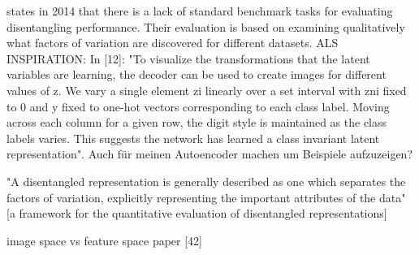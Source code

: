 \documentclass[12pt,a4paper]{article}
\begin{document}
\par\cite{1412.6583} states in 2014 that there is a lack of standard benchmark tasks for evaluating disentangling performance. Their evaluation is based on examining qualitatively what factors of variation are discovered for different datasets. ALS INSPIRATION: In [12]: "To visualize the transformations that the latent variables are learning, the decoder can be used to create images for different values of z. We vary a single element zi linearly over a set interval with zni fixed to 0 and y fixed to one-hot vectors corresponding to each class label. Moving across each column for a given row, the digit style is maintained as the class labels varies. This suggests the network has learned a class invariant latent representation". Auch für meinen Autoencoder machen um Beispiele aufzuzeigen?

\par "A disentangled representation is generally described as one which separates the factors of variation, explicitly representing the important attributes of the data" [a framework for the quantitative evaluation of disentangled representations]

\par image space vs feature space paper [42]
\end{document}
